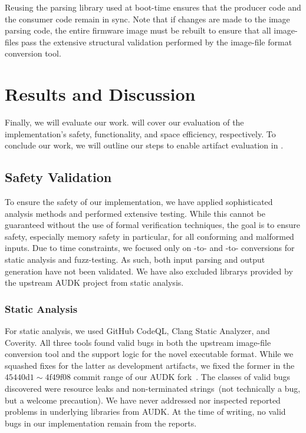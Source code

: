 Reusing the parsing \gls{library} used at boot-time ensures that the producer code and the consumer code remain in sync. Note that if changes are made to the \gls{image} parsing code, the entire \gls{firmware} \gls{image} must be rebuilt to ensure that all \glspl{image-file} pass the extensive structural validation performed by the \gls{image-file} format conversion tool.

\chapter{Results and Discussion}
\label{chap:results}

Finally, we will evaluate our work.  will cover our evaluation of the implementation's safety, functionality, and space efficiency, respectively. To conclude our work, we will outline our steps to enable artifact evaluation in .

\section{Safety Validation}
\label{sec:safety_val}

To ensure the safety of our implementation, we have applied sophisticated analysis methods and performed extensive testing. While this cannot be guaranteed without the use of formal verification techniques, the goal is to ensure safety, especially memory safety in particular, for all conforming and malformed inputs. Due to time constraints, we focused only on -to- and -to- conversions for static analysis and \gls{fuzz-testing}. As such, both  input parsing and  output generation have not been validated. We have also excluded \glspl{library} provided by the upstream \gls{AUDK} project from static analysis.

\subsection{Static Analysis}

For static analysis, we used GitHub CodeQL, Clang Static Analyzer, and Coverity. All three tools found valid bugs in both the upstream \gls{image-file} conversion tool and the support logic for the novel executable format. While we squashed fixes for the latter as development artifacts, we fixed the former in the $\mathrm{45440d1 \sim 4f49f08}$ commit range of our \gls{AUDK} fork~\cite{thesis-git}. The classes of valid bugs discovered were resource leaks and non-terminated strings~(not technically a bug, but a welcome precaution). We have never addressed nor inspected reported problems in underlying libraries from \gls{AUDK}. At the time of writing, no valid bugs in our implementation remain from the reports.

